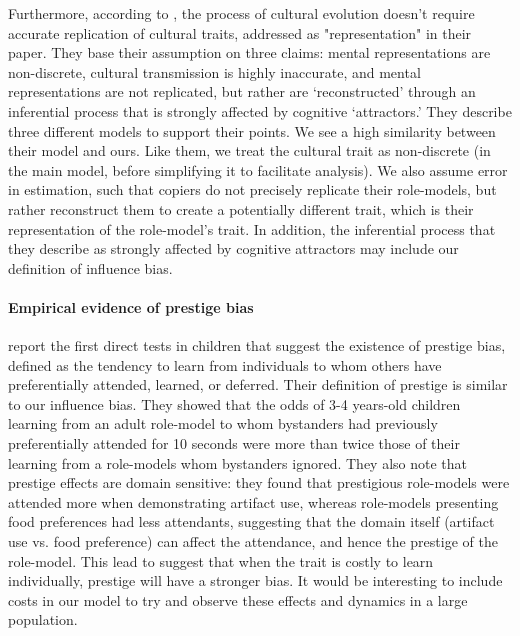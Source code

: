 \documentclass[12pt]{extarticle}
\begin{document}
Furthermore, according to \citet{no_replication}, the process of cultural evolution doesn't require accurate replication of cultural traits, addressed as "representation" in their paper.
They base their assumption on three claims: mental representations are non-discrete, cultural transmission is highly inaccurate, and mental representations are not replicated, but rather are `reconstructed' through an inferential process that is strongly affected by cognitive `attractors.' They describe three different models to support their points.
We see a high similarity between their model and ours. Like them, we treat the cultural trait as non-discrete (in the main model, before simplifying it to facilitate analysis). We also assume error in estimation, such that copiers do not precisely replicate their role-models, but rather reconstruct them to create a potentially different trait, which is their representation of the role-model's trait. In addition, the inferential process that they describe as strongly affected by cognitive attractors may include our definition of influence bias.

\paragraph{Empirical evidence of prestige bias}
\citet{prestige_cultural_learning} report the first direct tests in children that suggest the existence of prestige bias, defined as the tendency to learn from individuals to whom others have preferentially attended, learned, or deferred.
Their definition of prestige is similar to our influence bias. They showed that the odds of 3-4 years-old children learning from an adult role-model to whom bystanders had previously preferentially attended for 10 seconds were more than twice those of their learning from a role-models whom bystanders ignored.
They also note that prestige effects are domain sensitive: they found that prestigious role-models were attended more when demonstrating artifact use, whereas role-models presenting food preferences had less attendants, suggesting that the domain itself (artifact use vs. food preference) can affect the attendance, and hence the prestige of the role-model.
This lead \citet{prestige_cultural_learning} to suggest that when the trait is costly to learn individually, prestige will have a stronger bias.
It would be interesting to include costs in our model to try and observe these effects and dynamics in a large population.
\end{document}
